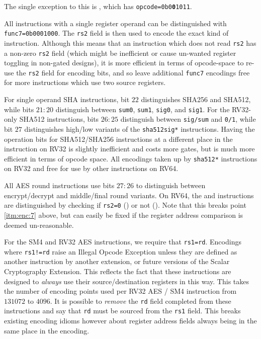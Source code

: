 \noindent
The single exception to this is , which has
{\tt opcode=0b0{\bf 0}1011}.

All instructions with a single register operand can be distinguished
with {\tt func7=0b0001000}.
The {\tt rs2} field is then used to encode the exact kind of instruction.
Although this means that an instruction which does not read {\tt rs2} has
a non-zero {\tt rs2} field (which might be inefficient or cause un-wanted
register toggling in non-gated designs),
it is more efficient in terms of opcode-space to re-use the {\tt rs2} field
for encoding bits, and
so leave additional {\tt func7} encodings free for more instructions which
use two source registers.

For single operand SHA instructions,
bit $22$ distinguishes SHA256 and SHA512, while
bits $21:20$ distinguish between
{\tt sum0},
{\tt sum1},
{\tt sig0},
and
{\tt sig1}.
For the RV32-only SHA512 instructions,
bits $26:25$ distinguish between {\tt sig/sum} and {\tt 0/1},
while bit $27$ distinguishes high/low variants of the {\tt sha512sig*}
instructions.
Having the operation bits for SHA512/SHA256 instructions at a different place
in the instruction on RV32 is slightly inefficient and costs more gates,
but is much more efficient in terms of opcode space.
All encodings taken up by {\tt sha512*} instructions on RV32 and
free for use by other instructions on RV64.

All AES round instructions use bits $27:26$ to distinguish between
encrypt/decrypt and middle/final round variants.
On RV64, the  and  instructions
are distinguished by checking if
{\tt rs2=0} () or not ().
Note that this breaks point \ref{itm:enc:7} above, but can easily be
fixed if the register address comparison is deemed un-reasonable.

For the SM4 and RV32 AES instructions, we require that {\tt rs1=rd}.
Encodings where {\tt rs1!=rd} raise an Illegal Opcode Exception unless
they are defined as another instruction by another extension, or
future versions of the Scalar Cryptography Extension.
This reflects the fact that these instructions are designed to {\em always}
use their source/destination registers in this way.
This takes the number of encoding points used per RV32 AES / SM4 instruction
from $131072$ to $4096$.
It is possible to {\em remove} the {\tt rd} field completed from these
instructions and say that {\tt rd} must be sourced from the {\tt rs1}
field.
This breaks existing encoding idioms however about register address fields
always being in the same place in the encoding.


